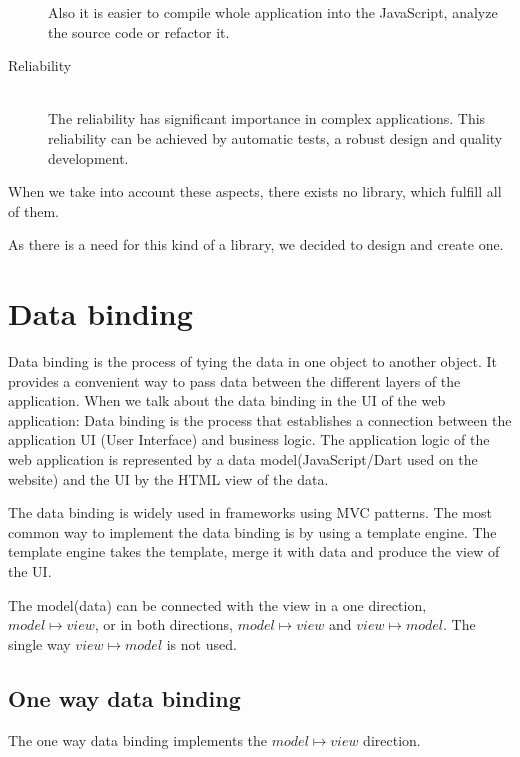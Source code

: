\documentclass[oneside, 12pt]{book}
\begin{document}
\begin{description}
		Also it is easier to compile whole application into the JavaScript, analyze the source code or refactor it.
	\item[Reliability] \hfill \\
		The reliability has significant importance in complex applications. 
		This reliability can be achieved by automatic tests, a robust design and quality development. 
\end{description}

When we take into account these aspects, there exists no library, which fulfill all of them.

As there is a need for this kind of a library, we decided to design and create one. 


\chapter{Data binding}\label{chap:databinding}

	Data binding is the process of tying the data in one object to another object. 
	It provides a convenient way to pass data between the different layers of the application.\cite{flexdatabinding}
	When we talk about the data binding in the UI of the web application: 
	Data binding is the process that establishes a connection between the application UI (User Interface) and business logic.\cite{databindingwikipedia}
	The application logic of the web application is represented by a data model(JavaScript/Dart used on the website) 
	and the UI by the HTML view of the data.

	The data binding is widely used in frameworks using MVC patterns. 
	The most common way to implement the data binding is by using a template engine. 
	The template engine takes the template, merge it with data and produce the view of the UI. 

	The model(data) can be connected with the view in a one direction, $model \mapsto view$, 
	or in both directions, $model \mapsto view$ and $view \mapsto model$. 
	The single way $view \mapsto model$ is not used. 

	\section{One way data binding}\label{sec:onewaydatabinding}

		The one way data binding implements the $model \mapsto view$ direction. 
		
\end{document}
